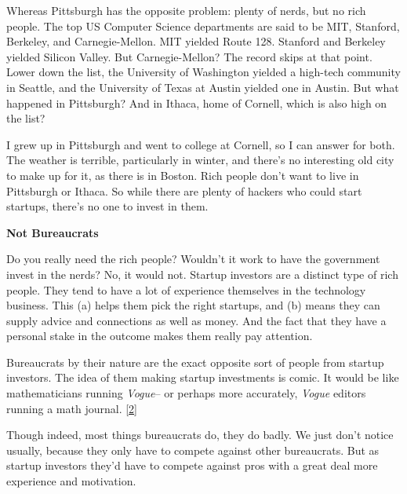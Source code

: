Whereas Pittsburgh has the opposite
                  problem: plenty of nerds, but no rich people. The top US
                  Computer Science departments are said to be MIT, Stanford,
                  Berkeley, and Carnegie-Mellon. MIT yielded Route 128. Stanford
                  and Berkeley yielded Silicon Valley. But Carnegie-Mellon? The
                  record skips at that point. Lower down the list, the
                  University of Washington yielded a high-tech community in
                  Seattle, and the University of Texas at Austin yielded one in
                  Austin. But what happened in Pittsburgh? And in Ithaca, home
                  of Cornell, which is also high on the list?

I grew
                  up in Pittsburgh and went to college at Cornell, so I can
                  answer for both. The weather is terrible, particularly in
                  winter, and there's no interesting old city to make up for it,
                  as there is in Boston. Rich people don't want to live in
                  Pittsburgh or Ithaca. So while there are plenty of hackers who
                  could start startups, there's no one to invest in them.

\textbf{Not Bureaucrats}

Do you really need the rich people? Wouldn't it
                  work to have the government invest in the nerds? No, it would
                  not. Startup investors are a distinct type of rich people.
                  They tend to have a lot of experience themselves in the
                  technology business. This (a) helps them pick the right
                  startups, and (b) means they can supply advice and connections
                  as well as money. And the fact that they have a personal stake
                  in the outcome makes them really pay attention.

Bureaucrats
                  by their nature are the exact opposite sort of people from
                  startup investors. The idea of them making startup investments
                  is comic. It would be like mathematicians running
                  \emph{Vogue}-- or perhaps more accurately,
                  \emph{Vogue} editors running a math journal.
                  [\href{\#f2n}{2}]

Though indeed, most things bureaucrats do, they
                  do badly. We just don't notice usually, because they only have
                  to compete against other bureaucrats. But as startup investors
                  they'd have to compete against pros with a great deal more
                  experience and motivation.

